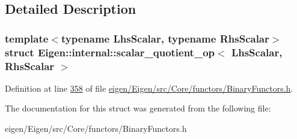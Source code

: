 \subsection{Detailed Description}
\subsubsection*{template$<$typename Lhs\+Scalar, typename Rhs\+Scalar$>$\newline
struct Eigen\+::internal\+::scalar\+\_\+quotient\+\_\+op$<$ Lhs\+Scalar, Rhs\+Scalar $>$}



Definition at line \hyperlink{eigen_2_eigen_2src_2_core_2functors_2_binary_functors_8h_source_l00358}{358} of file \hyperlink{eigen_2_eigen_2src_2_core_2functors_2_binary_functors_8h_source}{eigen/\+Eigen/src/\+Core/functors/\+Binary\+Functors.\+h}.



The documentation for this struct was generated from the following file\+:\begin{DoxyCompactItemize}
\item 
eigen/\+Eigen/src/\+Core/functors/\+Binary\+Functors.\+h\end{DoxyCompactItemize}
